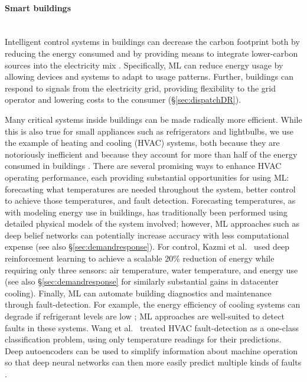 \documentclass[11pt]{report}
\newcommand{\et}{et al.~}
\newcommand{\Gap}{\texorpdfstring{\hfill}{}}
\newcommand{\Rec}{\texorpdfstring{{\small\emph{\color{blue}{\fbox{High Leverage}}}}}{}}
\begin{document}
\paragraph{Smart buildings}\Gap\textbf{\Rec}\mbox{}\\\label{sec:bldgopt}Intelligent control systems in buildings can decrease the carbon footprint both by reducing the energy consumed and by providing means to integrate lower-carbon sources into the electricity mix \cite{Gershenfeld1086}. Specifically, ML can reduce energy usage by allowing devices and systems to adapt to usage patterns. Further, buildings can respond to signals from the electricity grid, providing flexibility to the grid operator and lowering costs to the consumer (\S\ref{sec:dispatchDR}). 

Many critical systems inside buildings can be made radically more efficient. While this is also true for small appliances such as refrigerators and lightbulbs, we use the example of heating and cooling (HVAC) systems, both because they are notoriously inefficient and because they account for more than half of the energy consumed in buildings \cite{lucon_buildings_2014}. There are several promising ways to enhance HVAC operating performance, each providing substantial opportunities for using ML: forecasting what temperatures are needed throughout the system, better control to achieve those temperatures, and fault detection. Forecasting temperatures, as with modeling energy use in buildings, has traditionally been performed using detailed physical models of the system involved; however, ML approaches such as deep belief networks can potentially increase accuracy with less computational expense \cite{afroz2018modeling,fu2018deep} (see also \S\ref{sec:demandresponse}). For control, Kazmi \et \cite{kazmi_gigawatt-hour_2018} used deep reinforcement learning to achieve a scalable 20\% reduction of energy while requiring only three sensors: air temperature, water temperature, and energy use (see also \S\ref{sec:demandresponse} for similarly substantial gains in datacenter cooling). Finally, ML can automate building diagnostics and maintenance through fault-detection. For example, the energy efficiency of cooling systems can degrade if refrigerant levels are low \cite{KIM20121805}; ML approaches are well-suited to detect faults in these systems. Wang \et \cite{wang_fault_2017} treated HVAC fault-detection as a one-class classification problem, using only temperature readings for their predictions. Deep autoencoders can be used to simplify information about machine operation so that deep neural networks can then more easily predict multiple kinds of faults \cite{jia2016deep}.
\end{document}
